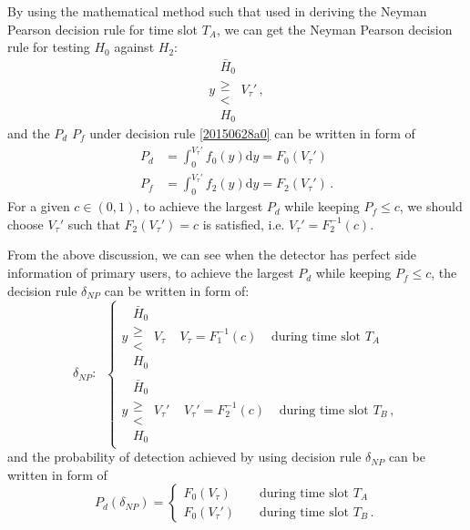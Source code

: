 By using the mathematical method such that used in deriving the Neyman Pearson decision rule for time slot $T_A$, we can get the Neyman Pearson decision rule for testing $H_0$ against $H_2$:
\begin{equation}
  y  \substack{\bar{H}_0 \\ \geq \\ < \\ H_0} V_\tau'\,,
  \label{20150628a0}
\end{equation}
and the $P_d$ $P_f$ under decision rule \eqref{20150628a0} can be written in form of 
\begin{equation}
  \begin{split}
  P_d &= \int_{0}^{V_\tau'} f_0(y) \mathrm{d}y = F_0(V_\tau')\\
  P_f &= \int_{0}^{V_\tau'} f_2(y) \mathrm{d}y= F_2(V_\tau')\,.
    \end{split}
    \label{20150628a1}
  \end{equation}
For a given $c \in (0, 1)$, to achieve the largest  $P_d$ while keeping $P_f \leq c$, we should choose $V_\tau'$ such that $F_2(V_\tau') = c$ is satisfied, i.e. $V_\tau' = F^{-1}_2(c)$. 

From the above discussion, we can see when the detector has perfect side information of primary users, to achieve the largest $P_d$ while keeping $P_f \leq c$, the decision rule $\delta_{NP}$ can be written in form of:
\begin{equation}
  \delta_{NP}:\;\;
\begin{cases}
 y  \substack{\bar{H}_0 \\ \geq \\ < \\ H_0} V_\tau\;\;\;\;V_\tau = F_1^{-1}(c)\;\;\;\;\text{during time slot $T_A$}\\
y  \substack{\bar{H}_0 \\ \geq \\ < \\ H_0} V_\tau'\;\;\;\;V_\tau' = F_2^{-1}(c)\;\;\;\;\text{during time slot $T_B$}\,,
\end{cases}
\label{20150702b1}
\end{equation}
and the probability of detection achieved by using  decision rule $\delta_{NP}$  can be written in form of
\begin{equation}
  P_d(\delta_{NP}) = \begin{cases}
    F_0(V_\tau)\;\;\;\;&\text{during time slot $T_A$}\\
    F_0(V_\tau')\;\;\;\;&\text{during time slot $T_B$}\,.
  \end{cases}
  \label{20150702b2}
\end{equation}

